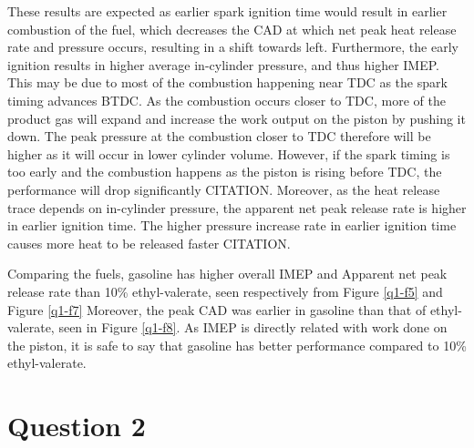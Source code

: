 \documentclass[11pt]{article}
\begin{document}
These results are expected as earlier spark ignition time would result in earlier combustion of the fuel, which decreases the CAD at which net peak heat release rate and pressure occurs, resulting in a shift towards left. Furthermore, the early ignition results in higher average in-cylinder pressure, and thus higher IMEP. This may be due to most of the combustion happening near TDC as the spark timing advances BTDC. As the combustion occurs closer to TDC, more of the product gas will expand and increase the work output on the piston by pushing it down. The peak pressure at the combustion closer to TDC therefore will be higher as it will occur in lower cylinder volume. However, if the spark timing is too early and the combustion happens as the piston is rising before TDC, the performance will drop significantly CITATION. Moreover, as the heat release trace depends on in-cylinder pressure, the apparent net peak release rate is higher in earlier ignition time. The higher pressure increase rate in earlier ignition time causes more heat to be released faster CITATION. 

Comparing the fuels, gasoline has higher overall IMEP and Apparent net peak release rate than 10\% ethyl-valerate, seen respectively from Figure \ref{q1-f5} and Figure \ref{q1-f7} Moreover, the peak CAD was earlier in gasoline than that of ethyl-valerate, seen in Figure \ref{q1-f8}. As IMEP is directly related with work done on the piston, it is safe to say that gasoline has better performance compared to 10\% ethyl-valerate. 
\section{Question 2}
\end{document}
